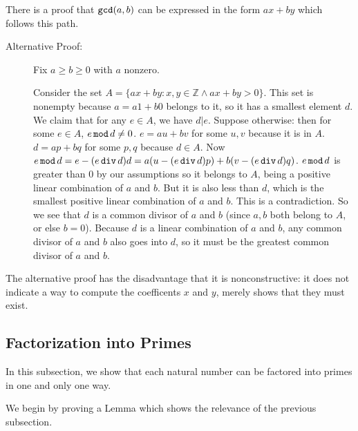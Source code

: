 \documentclass[12pt]{article}
\begin{document}
There is a proof that ${\tt gcd}(a,b)$ can be expressed in the form $ax+by$ which follows this path.

\begin{description}

\item[Alternative Proof:]  Fix $a \geq b \geq 0$ with $a$ nonzero.

Consider the set $A = \{ax+by :  x,y \in {\mathbb Z} \wedge ax+by >0\}$.  This set is nonempty because
$a=a1+b0$ belongs to it, so it has a smallest element $d$.  We claim that for any $e \in A$, we have
$d | e$.   Suppose otherwise:  then for some $e \in A$, $e \,{\tt mod}\, d \neq 0$.  $e=au+bv$ for some $u,v$ because it is in $A$.  $d = ap+bq$ for some $p,q$ because $d \in A$.   Now $e \,{\tt mod}\,d =
e - (e \,{\tt div}\,d)d = a(u- (e \,{\tt div}\,d)p)+b(v - (e \,{\tt div}\,d)q)$.  $e\,{\tt mod}\,d$ is greater than 0
by our assumptions so it belongs to $A$, being a positive linear combination of $a$ and $b$.  But it is also less than $d$, which is the smallest positive linear combination of $a$ and $b$.  This is a contradiction.   So we see that $d$
is a common divisor of $a$ and $b$ (since $a,b$ both belong to $A$, or else $b=0$).  Because $d$ is a linear combination of $a$ and $b$, any common divisor of $a$ and $b$ also goes into $d$, so it must be the greatest common divisor of $a$ and $b$.

\end{description}

The alternative proof has the disadvantage that it is nonconstructive:  it does not indicate a way to compute the coefficents $x$ and $y$, merely shows that they must exist.



\subsection{Factorization into Primes}

In this subsection, we show that each natural number can be factored into primes in one and only one way.

We begin by proving a Lemma which shows the relevance of the previous subsection.
\end{document}
